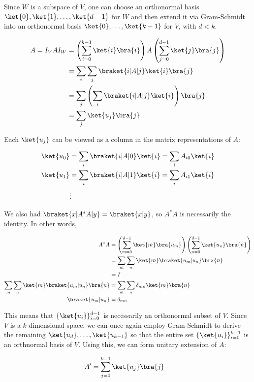 \par Since $W$ is a subspace of $V$, one can choose an orthonormal basis
$\ket{0}, \ket{1}, \ldots, \ket{d-1}$ for $W$ and then extend it via
Gram-Schmidt into an orthonormal basis $\ket{0}, \ldots, \ket{k-1}$ for $V$,
with $d < k$.

\begin{align}
A = I_V A I_W &= \left( \sum_{i = 0}^{k - 1}{\ket{i} \bra{i}} \right) A \left(
\sum_{j = 0}^{d - 1}{\ket{j} \bra{j}} \right) \\
&= \sum_i{\sum_j{\braket{i|A|j} \ket{i} \bra{j}}} \\
&= \sum_j{\left( \sum_i{\braket{i|A|j} \ket{i}} \right) \bra{j}} \\
&= \sum_j{\ket{u_j} \bra{j}}
\end{align}

\par Each $\ket{u_j}$ can be viewed as a column in the matrix representations of
$A$:

\begin{align*}
\ket{u_0} &= \sum_i{\braket{i|A|0} \ket{i}} = \sum_i{A_{i0} \ket{i}} \\
\ket{u_1} &= \sum_i{\braket{i|A|1} \ket{i}} = \sum_i{A_{i1} \ket{i}} \\
&\vdots
\end{align*}

\par We also had $\braket{x|A^* A|y} = \braket{x|y}$, so $A^* A$ is necessarily
the identity. In other words,

\begin{align}
A^* A &= \left( \sum_{m = 0}^{d - 1}{\ket{m} \bra{u_m}} \right) \left(
\sum_{n = 0}^{d - 1}{\ket{u_n} \bra{n}} \right) \\
&= \sum_m{\sum_n{\ket{m} \braket{u_m|u_n} \bra{n}}} \\
&= I \\
\sum_m{\sum_n{\ket{m} \braket{u_m|u_n} \bra{n}}} &= \sum_m{\sum_n{\delta_{mn}
\ket{m} \bra{n}}} \\
\braket{u_m|u_n} &= \delta_{mn}
\end{align}

This means that $\{\ket{u_i}\}_{i = 0}^{d - 1}$ is necessarily an orthonormal
subset of $V$. Since $V$ is a $k$-dimensional space, we can once again employ
Gram-Schmidt to derive the remaining $\ket{u_d}, \ldots, \ket{u_{k-1}}$ so that
the entire set $\{\ket{u_i}\}_{i = 0}^{k - 1}$ is an orthnormal basis of $V$.
Using this, we can form unitary extension of $A$:

\begin{align}
A' &= \sum_{j = 0}^{k - 1}{\ket{u_j} \bra{j}}
\end{align}
